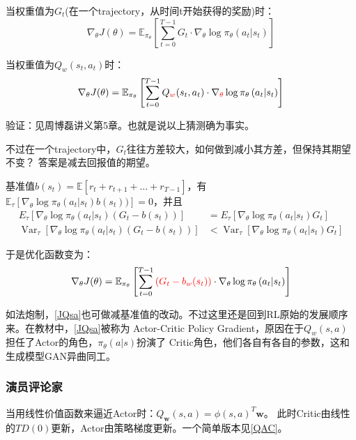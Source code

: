 \documentclass[UTF8]{ctexart}
\begin{document}
当权重值为$G_t$(在一个trajectory，从时间t开始获得的奖励)时：
\begin{equation} \label{JGt} \nabla_{\theta} J(\theta)=\mathbb{E}_{\pi_{\theta}}\left[\sum_{t=0}^{T-1} G_{t} 
    \cdot \nabla_{\theta} \log \pi_{\theta}\left(a_{t} | s_{t}\right)\right]\end{equation}

当权重值为$Q_{w}(s_t, a_t)$时：
\begin{equation} \label{JQsa}\nabla_{\theta} J(\theta)=\mathbb{E}_{\pi_{\theta}}\left[\sum_{t=0}^{T-1} Q_{\color{red}{w}}(s_t, a_t)
    \cdot \nabla_{\color{red}{\theta}} \log \pi_{\theta}\left(a_{t} | s_{t}\right)\right]\end{equation}

验证：见周博磊讲义第5章。也就是说以上猜测确为事实。

不过在一个trajectory中，$G_t$往往方差较大，如何做到减小其方差，但保持其期望不变？
答案是减去回报值的期望。

基准值$b(s_t) = \mathbb{E}[r_t + r_{t+1} + \ldots + r_{T-1}]$，有
$\mathbb{E}_{\tau}[\nabla_{\theta}\log\pi_{\theta}(a_{t}|s_t)b(s_t))]=0$，并且
\begin{equation}\begin{aligned}
    E_{\tau}\left[\nabla_{\theta} \log \pi_{\theta}\left(a_{t} | s_{t}\right)\left(G_{t}-b\left(s_{t}\right)\right)\right] &=E_{\tau}\left[\nabla_{\theta} \log \pi_{\theta}\left(a_{t} | s_{t}\right) G_{t}\right] \\
    \operatorname{Var}_{\tau}\left[\nabla_{\theta} \log \pi_{\theta}\left(a_{t} | s_{t}\right)\left(G_{t}-b\left(s_{t}\right)\right)\right] &<\operatorname{Var}_{\tau}\left[\nabla_{\theta} \log \pi_{\theta}\left(a_{t} | s_{t}\right) G_{t}\right]
    \end{aligned}
\end{equation}

于是优化函数变为：
\begin{equation} \label{JGt} \nabla_{\theta} J(\theta)=\mathbb{E}_{\pi_{\theta}}\left[\sum_{t=0}^{T-1} {\color{red} (G_{t} - b_{w}(s_t))}
\cdot \nabla_{\theta} \log \pi_{\theta}\left(a_{t} | s_{t}\right)\right]\end{equation}

如法炮制，\eqref{JQsa}也可做减基准值的改动。不过这里还是回到RL原始的发展顺序来。在教材中，\eqref{JQsa}被称为
Actor-Critic Policy Gradient，原因在于$Q_{w}(s, a)$担任了Actor的角色，$\pi_{\theta}(a|s)$扮演了
Critic角色，他们各自有各自的参数，这和生成模型GAN异曲同工。

\subsubsection{演员评论家}
当用线性价值函数来逼近Actor时：$Q_{\mathbf{w}}(s,a)=\phi(s, a)^{T}\mathbf{w}$。
此时Critic由线性的$TD(0)$更新，Actor由策略梯度更新。一个简单版本见\ref{QAC}。
\end{document}
